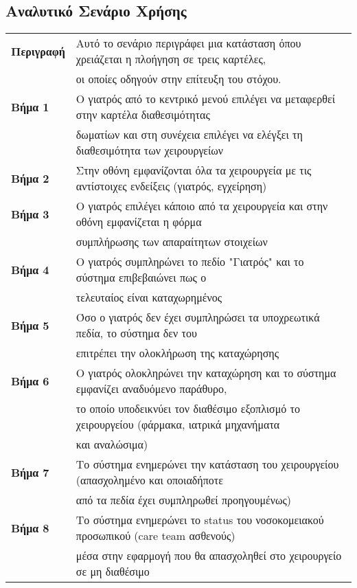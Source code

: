 \documentclass{article}
\newcommand\T{\rule{0pt}{2.6ex}}       %
\newcommand\B{\rule[-1.2ex]{0pt}{0pt}}
\begin{document}
 \newpage
 
\subsection{Αναλυτικό Σενάριο Χρήσης}
 
 \begin{center}
     \begin{tabular}{|l|l|}
     \hline
      \textbf{Περιγραφή} & Αυτό το σενάριο περιγράφει μια κατάσταση όπου χρειάζεται η πλοήγηση σε τρεις καρτέλες, \T \\& οι οποίες οδηγούν στην επίτευξη του στόχου. \B \\ 
      \hline
      \textbf{Βήμα 1} & Ο γιατρός από το κεντρικό μενού επιλέγει να μεταφερθεί στην καρτέλα διαθεσιμότητας \T \\& δωματίων και στη συνέχεια επιλέγει να ελέγξει τη διαθεσιμότητα των χειρουργείων\B \\
      \hline
      \textbf{Βήμα 2} & Στην οθόνη εμφανίζονται όλα τα χειρουργεία με τις αντίστοιχες ενδείξεις (γιατρός, εγχείρηση) \T \B \\
      \hline
      \textbf{Βήμα 3} & Ο γιατρός επιλέγει κάποιο από τα χειρουργεία και στην οθόνη εμφανίζεται η  φόρμα \T \\& συμπλήρωσης των απαραίτητων στοιχείων\B \\
      \hline
      \textbf{Βήμα 4} & Ο γιατρός συμπληρώνει το πεδίο "Γιατρός" και το σύστημα επιβεβαιώνει πως ο \T \\& τελευταίος είναι καταχωρημένος \B \\
      \hline      
      \textbf{Βήμα 5} &  Όσο ο γιατρός δεν έχει συμπληρώσει τα υποχρεωτικά πεδία, το σύστημα δεν του \T \\& επιτρέπει την ολοκλήρωση της καταχώρησης \B \\
      \hline
      \textbf{Βήμα 6} & Ο γιατρός ολοκληρώνει την καταχώρηση και το σύστημα εμφανίζει αναδυόμενο παράθυρο, \T \\& το οποίο υποδεικνύει τον διαθέσιμο εξοπλισμό το χειρουργείου (φάρμακα, ιατρικά μηχανήματα \\& και αναλώσιμα)\B \\
      \hline
      \textbf{Βήμα 7} & Το σύστημα ενημερώνει την κατάσταση του χειρουργείου (απασχολημένο και οποιαδήποτε \T \\& από τα πεδία έχει συμπληρωθεί προηγουμένως) \B \\
      \hline
      \textbf{Βήμα 8} & Το σύστημα ενημερώνει το status του νοσοκομειακού προσωπικού (care team ασθενούς) \T \\& μέσα στην εφαρμογή που θα απασχοληθεί στο χειρουργείο σε μη διαθέσιμο  \B \\
      \hline 
     \end{tabular}
 \end{center}
\end{document}
